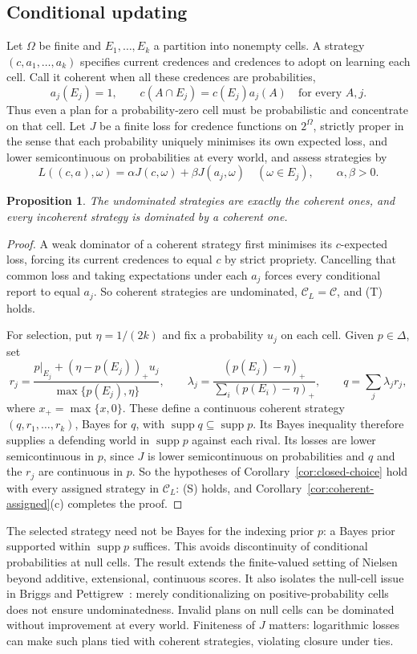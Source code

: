 \documentclass[11pt]{article}
\newtheorem{proposition}[theorem]{Proposition}
\theoremstyle{definition}
\newcommand{\C}{\mathcal C}
\newcommand{\supp}{\operatorname{supp}}
\begin{document}
\subsection{Conditional updating}
Let $\Omega$ be finite and $E_1,\ldots,E_k$ a partition into nonempty cells. A strategy $(c,a_1,\ldots,a_k)$ specifies current credences and credences to adopt on learning each cell. Call it coherent when all these credences are probabilities,
\[
a_j(E_j)=1,\qquad c(A\cap E_j)=c(E_j)a_j(A)\quad\text{for every }A,j.
\]
Thus even a plan for a probability-zero cell must be probabilistic and concentrate on that cell. Let $J$ be a finite loss for credence functions on $2^\Omega$, strictly proper in the sense that each probability uniquely minimises its own expected loss, and lower semicontinuous on probabilities at every world, and assess strategies by
\[
L((c,a),\omega)=\alpha J(c,\omega)+\beta J(a_j,\omega)
\quad(\omega\in E_j),\qquad \alpha,\beta>0.
\]
\begin{proposition}\label{prop:short-updating}
The undominated strategies are exactly the coherent ones, and every incoherent strategy is dominated by a coherent one.
\end{proposition}
\begin{proof}
A weak dominator of a coherent strategy first minimises its $c$-expected loss, forcing its current credences to equal $c$ by strict propriety. Cancelling that common loss and taking expectations under each $a_j$ forces every conditional report to equal $a_j$. So coherent strategies are undominated{\color{red}, $\C_L=\C$, and (T) holds}.

For selection, put $\eta=1/(2k)$ and fix a probability $u_j$ on each cell. Given $p\in\Delta$, set
\[
r_j=\frac{p|_{E_j}+(\eta-p(E_j))_+u_j}{\max\{p(E_j),\eta\}},\qquad
\lambda_j=\frac{(p(E_j)-\eta)_+}{\sum_i(p(E_i)-\eta)_+},\qquad
q=\sum_j\lambda_jr_j,
\]
where $x_+=\max\{x,0\}$. These define a continuous coherent strategy $(q,r_1,\ldots,r_k)$, Bayes for $q$, with $\supp q\subseteq\supp p$. Its Bayes inequality therefore supplies a defending world in $\supp p$ against each rival. Its losses are lower semicontinuous{\color{red} in $p$, since $J$ is lower semicontinuous on probabilities and $q$ and the $r_j$ are continuous in $p$. So the hypotheses of Corollary~\ref{cor:closed-choice} hold with every assigned strategy in $\C_L$: (S) holds, and Corollary~\ref{cor:coherent-assigned}(c) completes the proof}.
\end{proof}
The selected strategy need not be Bayes for the indexing prior $p$: a Bayes prior supported within $\supp p$ suffices. This avoids discontinuity of conditional probabilities at null cells. The result extends the finite-valued setting of Nielsen~\cite{Nielsen2021} beyond additive, extensional, continuous scores. It also isolates the null-cell issue in Briggs and Pettigrew~\cite{Briggs2020}: merely conditionalizing on positive-probability cells does not ensure undominatedness. Invalid plans on null cells can be dominated without improvement at every world. Finiteness of $J$ matters: logarithmic losses can make such plans tied with coherent strategies, violating closure under ties.
\end{document}
